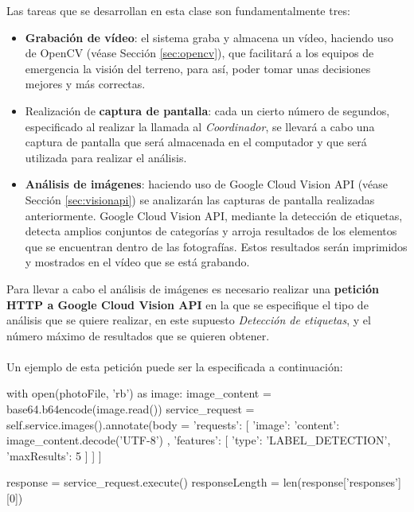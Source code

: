 Las tareas que se desarrollan en esta clase son fundamentalmente tres:
\begin{itemize}
\item \textbf{Grabación de vídeo}: el sistema graba y almacena un vídeo, haciendo uso de OpenCV (véase Sección \ref{sec:opencv}), que facilitará a los equipos de emergencia la visión del terreno, para así, poder tomar unas decisiones mejores y más correctas.
\item Realización de \textbf{captura de pantalla}: cada un cierto número de segundos, especificado al realizar la llamada al \textit{Coordinador}, se llevará a cabo una captura de pantalla que será almacenada en el computador y que será utilizada para realizar el análisis.
\item \textbf{Análisis de imágenes}: haciendo uso de Google Cloud Vision \acs{API} (véase Sección \ref{sec:visionapi}) se analizarán las capturas de pantalla realizadas anteriormente. Google Cloud Vision \acs{API}, mediante la detección de etiquetas, detecta amplios conjuntos de categorías y arroja resultados de los elementos que se encuentran dentro de las fotografías. Estos resultados serán imprimidos y mostrados en el vídeo que se está grabando. \\
\end{itemize}

Para llevar a cabo el análisis de imágenes es necesario realizar una \textbf{petición \acs{HTTP} a Google Cloud Vision \acs{API}} en la que se especifique el tipo de análisis que se quiere realizar, en este supuesto \textit{Detección de etiquetas}, y el número máximo de resultados que se quieren obtener. \\ \\

Un ejemplo de esta petición puede ser la especificada a continuación:

\begin{listing}[
 float=h!,
 language = Python,
 caption = {Ejemplo de petición a Google Cloud Vision \acs{API} para la detección de etiquetas},
 label  = code:analisis]
with open(photoFile, 'rb') as image:
	image_content = base64.b64encode(image.read())
    service_request = self.service.images().annotate(body = {
    	'requests': [{
        	'image': {
          		'content': image_content.decode('UTF-8')
        			},
        		'features': [{
          			'type': 'LABEL_DETECTION',
          			'maxResults': 5
        		}]
      	}]
    }]
    
		
    response = service_request.execute()
	responseLength = len(response['responses'][0])
\end{listing}

